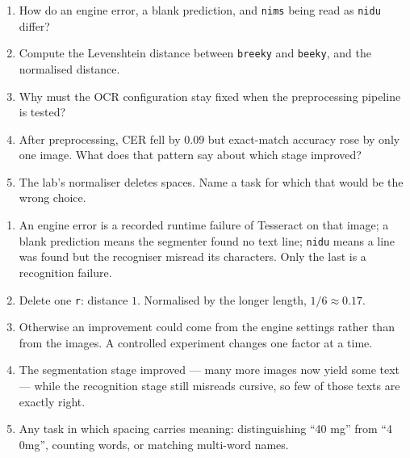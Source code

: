 

\begin{quickcheck}
\begin{enumerate}
  \item How do an engine error, a blank prediction, and \texttt{nims} being read as \texttt{nidu} differ?
  \item Compute the Levenshtein distance between \texttt{breeky} and \texttt{beeky}, and the normalised distance.
  \item Why must the OCR configuration stay fixed when the preprocessing pipeline is tested?
  \item After preprocessing, CER fell by $0.09$ but exact-match accuracy rose by only one image. What does that pattern say about which stage improved?
  \item The lab's normaliser deletes spaces. Name a task for which that would be the wrong choice.
\end{enumerate}
\end{quickcheck}

\begin{checkanswers}
\begin{enumerate}
  \item An engine error is a recorded runtime failure of Tesseract on that image; a blank prediction means the segmenter found no text line; \texttt{nidu} means a line was found but the recogniser misread its characters. Only the last is a recognition failure.
  \item Delete one \texttt{r}: distance $1$. Normalised by the longer length, $1/6\approx0.17$.
  \item Otherwise an improvement could come from the engine settings rather than from the images. A controlled experiment changes one factor at a time.
  \item The segmentation stage improved --- many more images now yield some text --- while the recognition stage still misreads cursive, so few of those texts are exactly right.
  \item Any task in which spacing carries meaning: distinguishing ``40 mg'' from ``4 0mg'', counting words, or matching multi-word names.
\end{enumerate}
\end{checkanswers}
